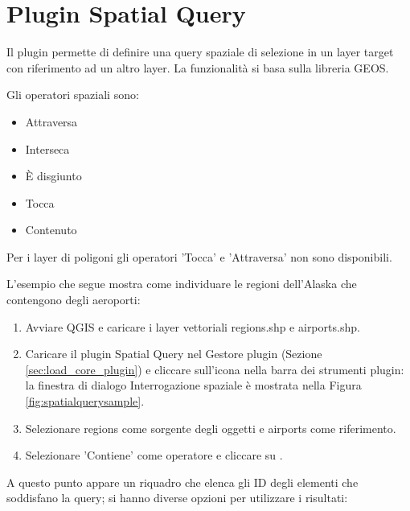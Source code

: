 
\section{Plugin Spatial Query}\label{sec:spatial_query}


Il plugin  permette di definire una query 
spaziale di selezione in un layer target con riferimento ad un altro layer. La funzionalità 
si basa sulla libreria GEOS. 

Gli operatori spaziali sono:

\begin{itemize}[label=--]
\item Attraversa
\item Interseca
\item È disgiunto
\item Tocca
\item Contenuto
\end{itemize}

Per i layer di poligoni gli operatori 'Tocca' e 'Attraversa' non sono disponibili.


L'esempio che segue mostra come individuare le regioni dell'Alaska che contengono degli aeroporti:

\begin{enumerate}
  \item Avviare QGIS e caricare i layer vettoriali regions.shp e airports.shp. 
  \item Caricare il plugin Spatial Query nel Gestore plugin (Sezione 
  \ref{sec:load_core_plugin}) e cliccare sull'icona     
  nella barra dei strumenti plugin: la finestra di dialogo Interrogazione spaziale è mostrata nella Figura \ref{fig:spatialquerysample}.
  \item Selezionare regions come sorgente degli oggetti e airports come riferimento.
  \item Selezionare 'Contiene' come operatore e cliccare su .
\end{enumerate}

A questo punto appare un riquadro che elenca gli ID degli elementi che soddisfano la query; si hanno diverse opzioni 
per utilizzare i risultati:


